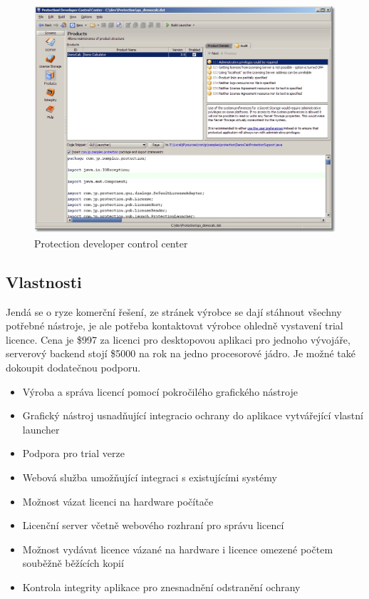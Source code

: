 \begin{figure}[TB]
\begin{center}
\includegraphics[width=12cm]{figures/protection4.PNG}
\caption{Protection developer control center}
\label{fig:protection4-ui} 
\end{center}
\end{figure}

\subsection*{Vlastnosti}
Jendá se o ryze komerční řešení, ze stránek výrobce se dají stáhnout všechny
potřebné nástroje, je ale potřeba kontaktovat výrobce ohledně vystavení trial
licence. Cena je \$997 za licenci pro desktopovou aplikaci pro jednoho
vývojáře, serverový backend stojí \$5000 na rok na jedno procesorové jádro. Je
možné také dokoupit dodatečnou podporu.

\begin{itemize}
  \item Výroba a správa licencí pomocí pokročilého grafického nástroje
  \item Grafický nástroj usnadňující integracio ochrany do aplikace vytvářející
  vlastní launcher
  \item Podpora pro trial verze
  \item Webová služba umožňující integraci s existujícími systémy
  \item Možnost vázat licenci na hardware počítače
  \item Licenční server včetně webového rozhraní pro správu licencí
  \item Možnost vydávat licence vázané na hardware i licence omezené počtem
  souběžně běžících kopií
  \item Kontrola integrity aplikace pro znesnadnění odstranění ochrany
\end{itemize}


